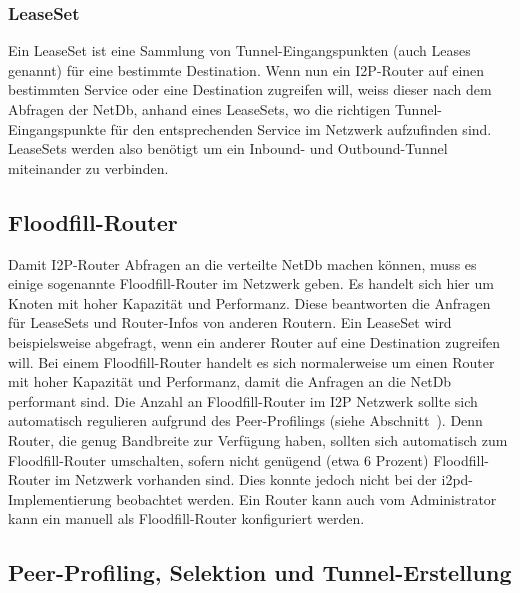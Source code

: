 \subsubsection{LeaseSet}

Ein LeaseSet ist eine Sammlung von Tunnel-Eingangspunkten (auch Leases genannt) für eine bestimmte Destination.
Wenn nun ein I2P-Router auf einen bestimmten Service oder eine Destination zugreifen will,
weiss dieser nach dem Abfragen der NetDb, anhand eines LeaseSets,
wo die richtigen Tunnel-Eingangspunkte für den entsprechenden Service im Netzwerk aufzufinden sind.
LeaseSets werden also benötigt um ein Inbound- und Outbound-Tunnel miteinander zu verbinden.
\parencite{astolfi_i2p_2015}

\subsection{Floodfill-Router}

Damit I2P-Router Abfragen an die verteilte NetDb machen können, muss es einige sogenannte Floodfill-Router im Netzwerk geben. Es handelt sich hier um Knoten mit hoher Kapazität und Performanz.
Diese beantworten die Anfragen für LeaseSets und Router-Infos von anderen Routern.
Ein LeaseSet wird beispielsweise abgefragt, wenn ein anderer Router auf eine Destination zugreifen will.
Bei einem Floodfill-Router handelt es sich normalerweise um einen Router mit hoher Kapazität und Performanz, damit die Anfragen an die NetDb performant sind.
Die Anzahl an Floodfill-Router im I2P Netzwerk sollte sich automatisch regulieren aufgrund des Peer-Profilings (siehe Abschnitt~).
Denn Router, die genug Bandbreite zur Verfügung haben, sollten sich automatisch zum Floodfill-Router umschalten, sofern nicht genügend (etwa 6 Prozent) Floodfill-Router im Netzwerk vorhanden sind.
Dies konnte jedoch nicht bei der i2pd-Implementierung beobachtet werden.
Ein Router kann auch vom Administrator kann ein manuell als Floodfill-Router konfiguriert werden.
\parencite[S.~5-6]{timpanaro_monitoring_2011}

\subsection{Peer-Profiling, Selektion und Tunnel-Erstellung}\label{sec:tunnelerstellung}

